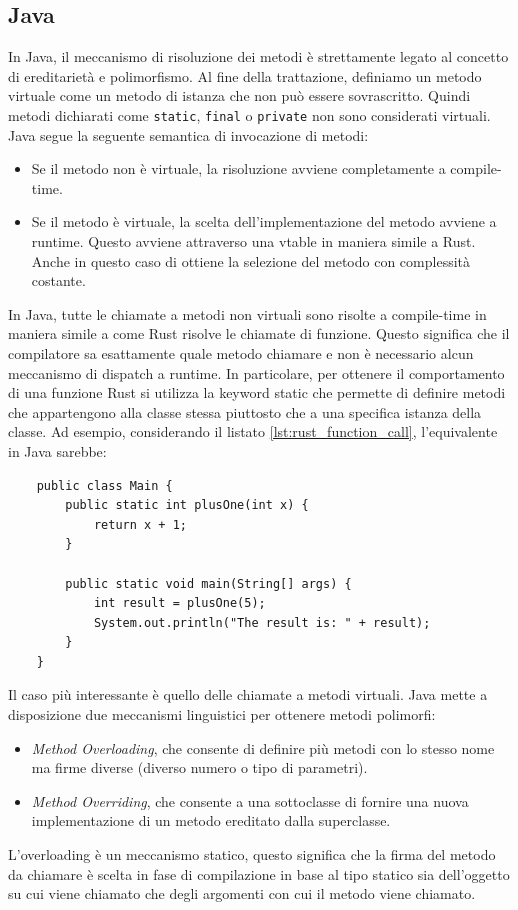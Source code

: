 \subsection{Java}
In Java, il meccanismo di risoluzione dei metodi è strettamente legato al concetto di ereditarietà e polimorfismo. Al fine della trattazione, definiamo un metodo virtuale come un metodo di istanza che non può essere sovrascritto. Quindi metodi dichiarati come \texttt{static}, \texttt{final} o \texttt{private} non sono considerati virtuali. Java segue la seguente semantica di invocazione di metodi:
\begin{itemize}
    \item Se il metodo non è virtuale, la risoluzione avviene completamente a compile-time.
    \item Se il metodo è virtuale, la scelta dell'implementazione del metodo avviene a runtime. Questo avviene attraverso una vtable in maniera simile a Rust. Anche in questo caso di ottiene la selezione del metodo con complessità costante. 
\end{itemize} 
In Java, tutte le chiamate a metodi non virtuali sono risolte a compile-time in maniera simile a come Rust risolve le chiamate di funzione. Questo significa che il compilatore sa esattamente quale metodo chiamare e non è necessario alcun meccanismo di dispatch a runtime. In particolare, per ottenere il comportamento di una funzione Rust si utilizza la keyword static che permette di definire metodi che appartengono alla classe stessa piuttosto che a una specifica istanza della classe. Ad esempio, considerando il listato \ref{lst:rust_function_call}, l'equivalente in Java sarebbe:
\begin{verbatim}
    public class Main {
        public static int plusOne(int x) {
            return x + 1;
        }

        public static void main(String[] args) {
            int result = plusOne(5);
            System.out.println("The result is: " + result);
        }
    }
\end{verbatim}
Il caso più interessante è quello delle chiamate a metodi virtuali. Java mette a disposizione due meccanismi linguistici per ottenere metodi polimorfi:
\begin{itemize}
    \item \textit{Method Overloading}, che consente di definire più metodi con lo stesso nome ma firme diverse (diverso numero o tipo di parametri). 
    \item \textit{Method Overriding}, che consente a una sottoclasse di fornire una nuova implementazione di un metodo ereditato dalla superclasse. 
\end{itemize}
L'overloading è un meccanismo statico, questo significa che la firma del metodo da chiamare è scelta in fase di compilazione in base al tipo statico sia dell'oggetto su cui viene chiamato che degli argomenti con cui il metodo viene chiamato.

